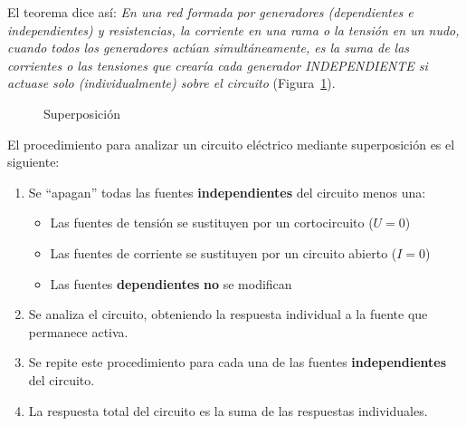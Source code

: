     El teorema dice así: \textit{En una red formada por generadores (dependientes e independientes) y resistencias, la corriente en una rama o la tensión en un  nudo, cuando todos los generadores actúan simultáneamente, es la suma de las corrientes o las tensiones que crearía cada generador INDEPENDIENTE si actuase solo (individualmente) sobre el circuito} (Figura~\ref{fig.superposicion_cc}).
    \begin{figure}[H]
        \centering
        \hfil
        \caption{Superposición}
        \label{fig.superposicion_cc}
    \end{figure}
    
El procedimiento para analizar un circuito eléctrico mediante superposición es el siguiente: 
\begin{enumerate}
\item Se ``apagan'' todas las fuentes \textbf{independientes} del circuito menos una:
    \begin{itemize}
    \item Las fuentes de tensión se sustituyen por un cortocircuito ($U = 0$)
    \item Las fuentes de corriente se sustituyen por un circuito abierto ($I = 0$)
    \item Las fuentes \textbf{dependientes} \textbf{no} se modifican
    \end{itemize}
\item Se analiza el circuito, obteniendo la respuesta individual a la fuente que permanece activa.
\item Se repite este procedimiento para cada una de las fuentes \textbf{independientes} del circuito.
\item La respuesta total del circuito es la suma de las respuestas individuales.
\end{enumerate}

